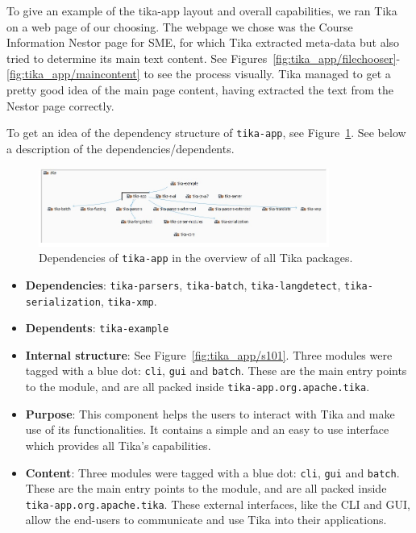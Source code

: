 \documentclass{article}
\begin{document}
To give an example of the tika-app layout and overall capabilities, we ran Tika on a web page of our choosing. The webpage we chose was the Course Information Nestor page for SME, for which Tika extracted meta-data but also tried to determine its main text content. See Figures~\ref{fig:tika_app/filechooser}-\ref{fig:tika_app/maincontent} to see the process visually. Tika managed to get a pretty good idea of the main page content, having extracted the text from the Nestor page correctly.

To get an idea of the dependency structure of \texttt{tika-app}, see Figure~\ref{fig:tika_app/s101-overview}. See below a description of the dependencies/dependents.
\begin{figure}[ht]
    \centering
    \includegraphics[width=0.85\textwidth]{report/images/tika_app/s101-overview.jpeg}
    \caption{Dependencies of \texttt{tika-app} in the overview of all Tika packages.}
    \label{fig:tika_app/s101-overview}
\end{figure}

\begin{itemize}
    \item \textbf{Dependencies}: \texttt{tika-parsers}, \texttt{tika-batch}, \texttt{tika-langdetect}, \texttt{tika-serialization}, \texttt{tika-xmp}.
    \item \textbf{Dependents}: \texttt{tika-example}
    \item \textbf{Internal structure}: See Figure~\ref{fig:tika_app/s101}. Three modules were tagged with a blue dot: \texttt{cli}, \texttt{gui} and \texttt{batch}. These are the main entry points to the module, and are all packed inside \texttt{tika-app.org.apache.tika}.
    \item\textbf{Purpose}: This component helps the users to interact with Tika and make use of its functionalities. It contains a simple and an easy to use interface which provides all Tika’s capabilities.
\item\textbf{Content}: Three modules were tagged with a blue dot: \texttt{cli}, \texttt{gui} and \texttt{batch}. These are the main entry points to the module, and are all packed inside \texttt{tika-app.org.apache.tika}. These external interfaces, like the CLI and GUI, allow the end-users to communicate and use Tika into their applications. 

\end{itemize}
\end{document}
